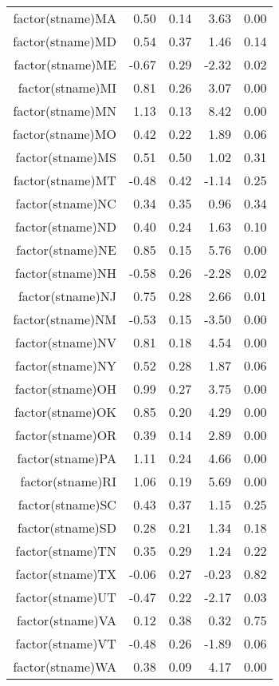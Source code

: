 \begin{table}[ht]
\begin{tabular}{rrrrr}
  factor(stname)MA & 0.50 & 0.14 & 3.63 & 0.00 \\ 
  factor(stname)MD & 0.54 & 0.37 & 1.46 & 0.14 \\ 
  factor(stname)ME & -0.67 & 0.29 & -2.32 & 0.02 \\ 
  factor(stname)MI & 0.81 & 0.26 & 3.07 & 0.00 \\ 
  factor(stname)MN & 1.13 & 0.13 & 8.42 & 0.00 \\ 
  factor(stname)MO & 0.42 & 0.22 & 1.89 & 0.06 \\ 
  factor(stname)MS & 0.51 & 0.50 & 1.02 & 0.31 \\ 
  factor(stname)MT & -0.48 & 0.42 & -1.14 & 0.25 \\ 
  factor(stname)NC & 0.34 & 0.35 & 0.96 & 0.34 \\ 
  factor(stname)ND & 0.40 & 0.24 & 1.63 & 0.10 \\ 
  factor(stname)NE & 0.85 & 0.15 & 5.76 & 0.00 \\ 
  factor(stname)NH & -0.58 & 0.26 & -2.28 & 0.02 \\ 
  factor(stname)NJ & 0.75 & 0.28 & 2.66 & 0.01 \\ 
  factor(stname)NM & -0.53 & 0.15 & -3.50 & 0.00 \\ 
  factor(stname)NV & 0.81 & 0.18 & 4.54 & 0.00 \\ 
  factor(stname)NY & 0.52 & 0.28 & 1.87 & 0.06 \\ 
  factor(stname)OH & 0.99 & 0.27 & 3.75 & 0.00 \\ 
  factor(stname)OK & 0.85 & 0.20 & 4.29 & 0.00 \\ 
  factor(stname)OR & 0.39 & 0.14 & 2.89 & 0.00 \\ 
  factor(stname)PA & 1.11 & 0.24 & 4.66 & 0.00 \\ 
  factor(stname)RI & 1.06 & 0.19 & 5.69 & 0.00 \\ 
  factor(stname)SC & 0.43 & 0.37 & 1.15 & 0.25 \\ 
  factor(stname)SD & 0.28 & 0.21 & 1.34 & 0.18 \\ 
  factor(stname)TN & 0.35 & 0.29 & 1.24 & 0.22 \\ 
  factor(stname)TX & -0.06 & 0.27 & -0.23 & 0.82 \\ 
  factor(stname)UT & -0.47 & 0.22 & -2.17 & 0.03 \\ 
  factor(stname)VA & 0.12 & 0.38 & 0.32 & 0.75 \\ 
  factor(stname)VT & -0.48 & 0.26 & -1.89 & 0.06 \\ 
  factor(stname)WA & 0.38 & 0.09 & 4.17 & 0.00 \\ 

\end{tabular}
\end{table}
